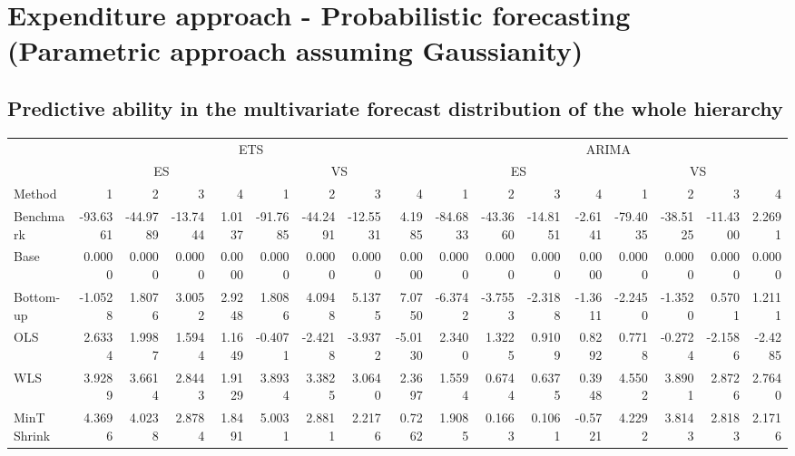 \documentclass[]{article}
\begin{document}
\section{Expenditure approach - Probabilistic forecasting (Parametric
approach assuming
Gaussianity)}\label{expenditure-approach---probabilistic-forecasting-parametric-approach-assuming-gaussianity}

\subsection{Predictive ability in the multivariate forecast distribution
of the whole
hierarchy}\label{predictive-ability-in-the-multivariate-forecast-distribution-of-the-whole-hierarchy}

\begin{table}[H]
\centering
\begin{tabular}{l|r|r|r|r|r|r|r|r|r|r|r|r|r|r|r|r}
\hline
\multicolumn{1}{c|}{ } & \multicolumn{8}{|c|}{ETS} & \multicolumn{8}{|c}{ARIMA} \\
\cline{2-9} \cline{10-17}
\multicolumn{1}{c|}{ } & \multicolumn{4}{|c|}{ES} & \multicolumn{4}{|c|}{VS} & \multicolumn{4}{|c|}{ES} & \multicolumn{4}{|c}{VS} \\
\cline{2-5} \cline{6-9} \cline{10-13} \cline{14-17}
Method & 1 & 2 & 3 & 4 & 1 & 2 & 3 & 4 & 1 & 2 & 3 & 4 & 1 & 2 & 3 & 4\\
\hline
Benchmark & -93.6361 & -44.9789 & -13.7444 & 1.0137 & -91.7685 & -44.2491 & -12.5531 & 4.1985 & -84.6833 & -43.3660 & -14.8151 & -2.6141 & -79.4035 & -38.5125 & -11.4300 & 2.2691\\
\hline
Base & 0.0000 & 0.0000 & 0.0000 & 0.0000 & 0.0000 & 0.0000 & 0.0000 & 0.0000 & 0.0000 & 0.0000 & 0.0000 & 0.0000 & 0.0000 & 0.0000 & 0.0000 & 0.0000\\
\hline
Bottom-up & -1.0528 & 1.8076 & 3.0052 & 2.9248 & 1.8086 & 4.0948 & 5.1375 & 7.0750 & -6.3742 & -3.7553 & -2.3188 & -1.3611 & -2.2450 & -1.3520 & 0.5701 & 1.2111\\
\hline
OLS & 2.6334 & 1.9987 & 1.5944 & 1.1649 & -0.4071 & -2.4218 & -3.9372 & -5.0130 & 2.3400 & 1.3225 & 0.9109 & 0.8292 & 0.7718 & -0.2724 & -2.1586 & -2.4285\\
\hline
WLS & 3.9289 & 3.6614 & 2.8443 & 1.9129 & 3.8934 & 3.3825 & 3.0640 & 2.3697 & 1.5594 & 0.6744 & 0.6375 & 0.3948 & 4.5502 & 3.8901 & 2.8726 & 2.7640\\
\hline
MinT Shrink & 4.3696 & 4.0238 & 2.8784 & 1.8491 & 5.0031 & 2.8811 & 2.2176 & 0.7262 & 1.9085 & 0.1663 & 0.1061 & -0.5721 & 4.2292 & 3.8143 & 2.8183 & 2.1716\\
\hline
\end{tabular}
\end{table}
\end{document}
